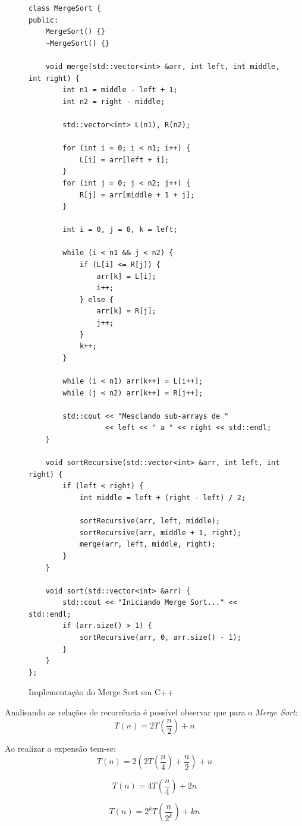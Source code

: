 \documentclass[
	article,			%
	11pt,				%
	oneside,			%
	a4paper,			%
	english,			%
	brazil,				%
	sumario=tradicional
	]{abntex2}
\begin{document}
\begin{figure}[H]
\centering
\begin{lstlisting}[]
class MergeSort {
public:
    MergeSort() {}
    ~MergeSort() {}

    void merge(std::vector<int> &arr, int left, int middle, int right) {
        int n1 = middle - left + 1;
        int n2 = right - middle;

        std::vector<int> L(n1), R(n2);

        for (int i = 0; i < n1; i++) {
            L[i] = arr[left + i];
        }
        for (int j = 0; j < n2; j++) {
            R[j] = arr[middle + 1 + j];
        }

        int i = 0, j = 0, k = left;

        while (i < n1 && j < n2) {
            if (L[i] <= R[j]) {
                arr[k] = L[i];
                i++;
            } else {
                arr[k] = R[j];
                j++;
            }
            k++;
        }

        while (i < n1) arr[k++] = L[i++];
        while (j < n2) arr[k++] = R[j++];

        std::cout << "Mesclando sub-arrays de "
                  << left << " a " << right << std::endl;
    }

    void sortRecursive(std::vector<int> &arr, int left, int right) {
        if (left < right) {
            int middle = left + (right - left) / 2;

            sortRecursive(arr, left, middle);
            sortRecursive(arr, middle + 1, right);
            merge(arr, left, middle, right);
        }
    }

    void sort(std::vector<int> &arr) {
        std::cout << "Iniciando Merge Sort..." << std::endl;
        if (arr.size() > 1) {
            sortRecursive(arr, 0, arr.size() - 1);
        }
    }
};
\end{lstlisting}
\caption{Implementação do Merge Sort em C++}
\label{fig:mergesort}
\end{figure}

Analisando as relações de recorrência é possível observar que para o \textit{Merge Sort}:
\[
T(n)=2T\left(\frac{n}{2}\right)+n
\]

Ao realizar a expensão tem-se:
\[
T(n)=2\left(2T\left(\frac{n}{4}\right)+\frac{n}{2}\right)+n
\]

\[
T(n)=4T\left(\frac{n}{4}\right)+2n
\]

\[
T(n)=2^k T\left(\frac{n}{2^k}\right)+kn
\]
\end{document}
